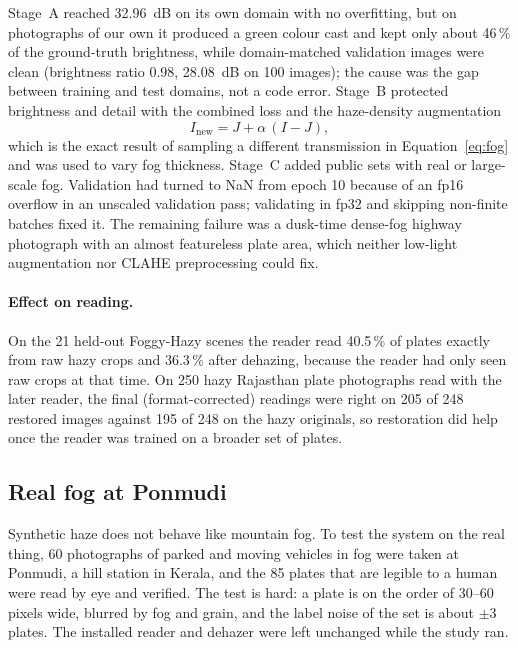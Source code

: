 Stage~A reached 32.96~dB on its own domain with no overfitting, but on photographs
of our own it produced a green colour cast and kept only about 46\,\% of the
ground-truth brightness, while domain-matched validation images were clean
(brightness ratio 0.98, 28.08~dB on 100 images); the cause was the gap between
training and test domains, not a code error. Stage~B protected brightness and
detail with the combined loss and the haze-density augmentation
\[
  I_{\text{new}} = J + \alpha\,(I - J),
\]
which is the exact result of sampling a different transmission in
Equation~\eqref{eq:fog} and was used to vary fog thickness. Stage~C added
public sets with real or large-scale fog. Validation had turned to NaN from
epoch 10 because of an fp16 overflow in an unscaled validation pass; validating
in fp32 and skipping non-finite batches fixed it. The remaining failure was a
dusk-time dense-fog highway photograph with an almost featureless plate area,
which neither low-light augmentation nor CLAHE preprocessing could fix.

\paragraph{Effect on reading.} On the 21 held-out Foggy-Hazy scenes the reader
read 40.5\,\% of plates exactly from raw hazy crops and 36.3\,\% after
dehazing, because the reader had only seen raw crops at that time. On 250
hazy Rajasthan plate photographs read with the later reader, the final
(format-corrected) readings were right on 205 of 248 restored images against
195 of 248 on the hazy originals, so restoration did help once the reader was
trained on a broader set of plates.

\subsection{Real fog at Ponmudi}
\label{sec:ponmudi}

Synthetic haze does not behave like mountain fog. To test the system on the
real thing, 60 photographs of parked and moving vehicles in fog were taken at
Ponmudi, a hill station in Kerala, and the 85 plates that are legible to a human
were read by eye and verified. The test is hard: a plate is on the order of
30--60 pixels wide, blurred by fog and grain, and the label noise of the set is
about $\pm3$ plates. The installed reader and dehazer were left unchanged while
the study ran.

